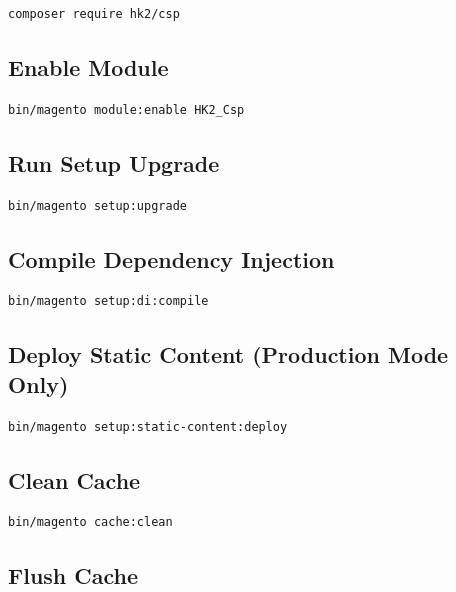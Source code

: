 \documentclass[11pt,a4paper]{article}
\begin{document}
\begin{lstlisting}[style=shell]
composer require hk2/csp
\end{lstlisting}

\subsection{Enable Module}

\begin{lstlisting}[style=shell]
bin/magento module:enable HK2_Csp
\end{lstlisting}

\subsection{Run Setup Upgrade}

\begin{lstlisting}[style=shell]
bin/magento setup:upgrade
\end{lstlisting}

\subsection{Compile Dependency Injection}

\begin{lstlisting}[style=shell]
bin/magento setup:di:compile
\end{lstlisting}

\subsection{Deploy Static Content (Production Mode Only)}

\begin{lstlisting}[style=shell]
bin/magento setup:static-content:deploy
\end{lstlisting}

\subsection{Clean Cache}

\begin{lstlisting}[style=shell]
bin/magento cache:clean
\end{lstlisting}

\subsection{Flush Cache}
\end{document}
